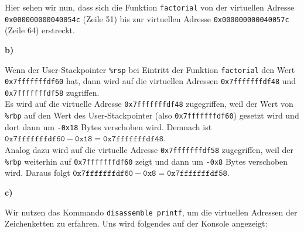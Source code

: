 \documentclass{ti2}
\begin{document}
Hier sehen wir nun, dass sich die Funktion \texttt{factorial} von der virtuellen Adresse \texttt{0x000000000040054c} (Zeile 51) bis zur virtuellen Adresse \texttt{0x000000000040057c} (Zeile 64) erstreckt.\par

\textbf{b)}\par

Wenn der User-Stackpointer \texttt{\%rsp} bei Eintritt der Funktion \texttt{factorial} den Wert \texttt{0x7fffffffdf60} hat, dann wird auf die virtuellen Adressen \texttt{0x7fffffffdf48} und \texttt{0x7fffffffdf58} zugriffen. \\
Es wird auf die virtuelle Adresse \texttt{0x7fffffffdf48} zugegriffen, weil der Wert von \texttt{\%rbp} auf den Wert des User-Stackpointer (also \texttt{0x7fffffffdf60}) gesetzt wird und dort dann um \texttt{-0x18} Bytes verschoben wird. Demnach ist $\texttt{0x7fffffffdf60} - \texttt{0x18} = \texttt{0x7fffffffdf48}$.\\
Analog dazu wird auf die virtuelle Adresse \texttt{0x7fffffffdf58} zugegriffen, weil der \texttt{\%rbp} weiterhin auf \texttt{0x7fffffffdf60} zeigt und dann um \texttt{-0x8} Bytes verschoben wird. Daraus folgt $\texttt{0x7fffffffdf60} - \texttt{0x8} = \texttt{0x7fffffffdf58}$.\par

\textbf{c)}\par

Wir nutzen das Kommando \texttt{disassemble printf}, um die virtuellen Adressen der Zeichenketten zu erfahren. Uns wird folgendes auf der Konsole angezeigt:
\end{document}
